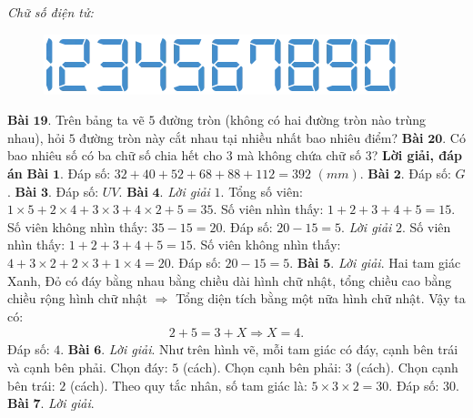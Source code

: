 \begin{multicols}{2}
	\vskip 0.1cm
	\textit{Chữ số điện tử:} 
	\begin{figure}[H]
		\centering
		\vspace*{-10pt}
		\captionsetup{labelformat= empty, justification=centering}
		\includegraphics[width=1\linewidth]{Bai18}
		\vspace*{-15pt}
	\end{figure}
	\textbf{\color{cackithi}Bài} $\pmb{19.}$ Trên bảng ta vẽ $5$ đường tròn (không có hai đường tròn nào trùng nhau), hỏi $5$ đường tròn này cắt nhau tại nhiều nhất bao nhiêu điểm? 
	\vskip 0.1cm
	\textbf{\color{cackithi}Bài} $\pmb{20.}$ Có bao nhiêu số có ba chữ số chia hết cho $3$ mà không chứa chữ số $3$?
	\vskip 0.1cm
	\textbf{\color{cackithi}Lời giải, đáp án}
	\vskip 0.1cm
	\textbf{\color{cackithi}Bài} $\pmb{1.}$ Đáp số: $32+40+52+68+88+112=392$ $(mm)$.
	\vskip 0.1cm
	\textbf{\color{cackithi}Bài} $\pmb{2.}$ Đáp số: $G$.
	\vskip 0.1cm
	\textbf{\color{cackithi}Bài} $\pmb{3.}$ Đáp số: $UV$.	 
	\vskip 0.1cm
	\textbf{\color{cackithi}Bài} $\pmb{4.}$
	\textit{Lời giải} $1$.
	Tổng số viên: $1\times5+2\times4+3\times3+4\times2+5 = 35$.
	\vskip 0.1cm
	Số viên nhìn thấy: $1+2+3+4+5 = 15$.
	\vskip 0.1cm
	Số viên không nhìn thấy: $35 - 15 = 20$.
	\vskip 0.1cm
	Đáp số: $20 - 15 = 5$.
	\vskip 0.1cm
	\textit{Lời giải} $2$.
	Số viên nhìn thấy: $1+2+3+4+5 = 15$.
	\vskip 0.1cm
	Số viên không nhìn thấy: $4 + 3\times2 + 2\times3 + 1\times4 = 20$.
	\vskip 0.1cm
	Đáp số: $20 - 15 = 5$.
	\vskip 0.1cm
	\textbf{\color{cackithi}Bài} $\pmb{5.}$ \textit{Lời giải}.
	Hai tam giác Xanh, Đỏ có đáy bằng nhau bằng chiều dài hình chữ nhật, tổng chiều cao bằng chiều rộng hình chữ nhật $\Rightarrow$ Tổng diện tích bằng một nữa hình chữ nhật. Vậy ta có:
	\begin{align*}
			2 + 5 = 3 + X \Rightarrow X = 4.
		\end{align*}
	Đáp số: $4$.
	\vskip 0.1cm
	\textbf{\color{cackithi}Bài} $\pmb{6.}$ \textit{Lời giải}.
	Như trên hình vẽ, mỗi tam giác có đáy, cạnh bên trái và cạnh bên phải.
	\vskip 0.1cm
	Chọn đáy: $5$ (cách).
	\vskip 0.1cm
	Chọn cạnh bên phải: $3$ (cách). 
	\vskip 0.1cm
	Chọn cạnh bên trái: $2$ (cách).
	\vskip 0.1cm
	Theo quy tắc nhân, số tam giác là: $5\times3\times2 = 30$.
	\vskip 0.1cm
	Đáp số: $30$.
	\vskip 0.1cm
	\textbf{\color{cackithi}Bài} $\pmb{7.}$ \textit{Lời giải}.

\end{multicols}
